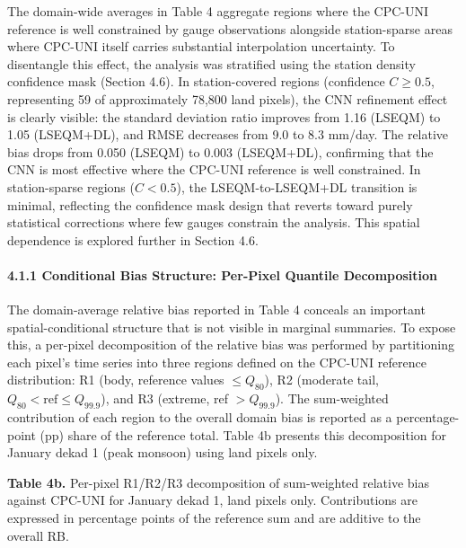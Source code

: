 \documentclass[
]{article}
\begin{document}
The domain-wide averages in Table 4 aggregate regions where the CPC-UNI
reference is well constrained by gauge observations alongside
station-sparse areas where CPC-UNI itself carries substantial
interpolation uncertainty. To disentangle this effect, the analysis was
stratified using the station density confidence mask (Section 4.6). In
station-covered regions (confidence \(C \geq 0.5\), representing 59 of
approximately 78,800 land pixels), the CNN refinement effect is clearly
visible: the standard deviation ratio improves from 1.16 (LSEQM) to 1.05
(LSEQM+DL), and RMSE decreases from 9.0 to 8.3 mm/day. The relative bias
drops from 0.050 (LSEQM) to 0.003 (LSEQM+DL), confirming that the CNN is
most effective where the CPC-UNI reference is well constrained. In
station-sparse regions (\(C < 0.5\)), the LSEQM-to-LSEQM+DL transition
is minimal, reflecting the confidence mask design that reverts toward
purely statistical corrections where few gauges constrain the analysis.
This spatial dependence is explored further in Section 4.6.

\paragraph{4.1.1 Conditional Bias Structure: Per-Pixel Quantile
Decomposition}

The domain-average relative bias reported in Table 4 conceals an
important spatial-conditional structure that is not visible in marginal
summaries. To expose this, a per-pixel decomposition of the relative
bias was performed by partitioning each pixel's time series into three
regions defined on the CPC-UNI reference distribution: R1 (body,
reference values \(\leq Q_{80}\)), R2 (moderate tail,
\(Q_{80} < \text{ref} \leq Q_{99.9}\)), and R3 (extreme, ref
\(> Q_{99.9}\)). The sum-weighted contribution of each region to the
overall domain bias is reported as a percentage-point (pp) share of the
reference total. Table 4b presents this decomposition for January dekad
1 (peak monsoon) using land pixels only.

\textbf{Table 4b.} Per-pixel R1/R2/R3 decomposition of sum-weighted
relative bias against CPC-UNI for January dekad 1, land pixels only.
Contributions are expressed in percentage points of the reference sum
and are additive to the overall RB.
\end{document}
